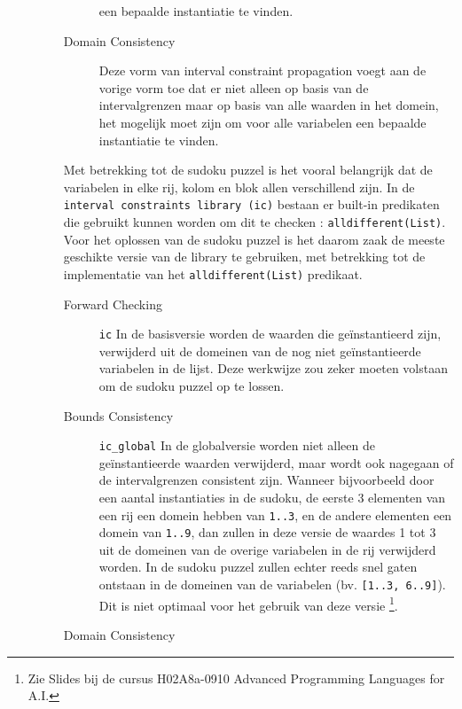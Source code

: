 \begin{enumerate}
\begin{description}
\begin{description}
                        een bepaalde instantiatie te vinden. 
                \item[Domain Consistency] 
                        Deze vorm van interval constraint propagation voegt aan de vorige vorm toe dat er niet alleen op
                        basis van de intervalgrenzen maar op basis van alle waarden in het domein, het mogelijk moet zijn
                        om voor alle variabelen een bepaalde instantiatie te vinden.
                \end{description}
        Met betrekking tot de sudoku puzzel is het vooral belangrijk dat de variabelen in elke rij, kolom en blok
        allen verschillend zijn. In de \verb|interval constraints library (ic)| bestaan er built-in predikaten 
        die gebruikt kunnen worden om dit te checken : \verb|alldifferent(List)|. Voor het oplossen van de sudoku
        puzzel is het daarom zaak de meeste geschikte versie van de library te gebruiken, met betrekking tot de implementatie
        van het \verb|alldifferent(List)| predikaat.
                \begin{description}
                \item[Forward Checking] 
                        \verb|ic| In de basisversie worden de waarden die ge\"instantieerd zijn, verwijderd uit de domeinen
                        van de nog niet ge\"instantieerde variabelen in de lijst. Deze werkwijze zou zeker moeten volstaan
                        om de sudoku puzzel op te lossen.
                \item[Bounds Consistency] 
                        \verb|ic_global| In de globalversie worden niet alleen de ge\"instantieerde waarden verwijderd,
                        maar wordt ook nagegaan of de intervalgrenzen consistent zijn. Wanneer bijvoorbeeld door een 
                        aantal instantiaties in de sudoku, de eerste 3 elementen van een rij een domein hebben 
                        van \verb|1..3|, en de andere elementen een domein van \verb|1..9|, 
                        dan zullen in deze versie de waardes 1 tot 3 uit de domeinen van de overige 
                        variabelen in de rij verwijderd worden. In de sudoku puzzel zullen echter reeds snel gaten
                        ontstaan in de domeinen van de variabelen (bv. \verb|[1..3, 6..9]|). Dit is niet optimaal
                        voor het gebruik van deze versie \footnote{Zie Slides bij de cursus 
                        H02A8a-0910 Advanced Programming Languages for A.I.}.
                \item[Domain Consistency] 

\end{description}
\end{description}
\end{enumerate}
